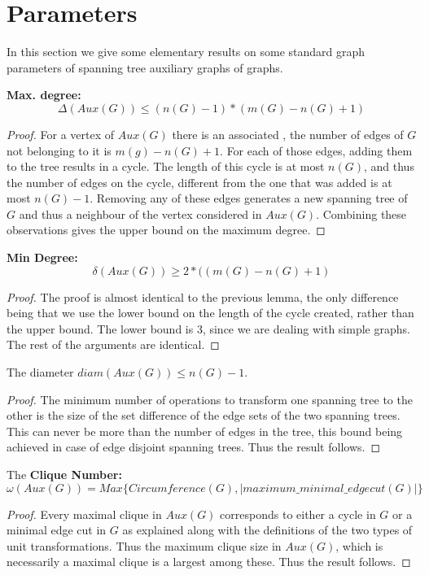 \documentclass{llncs}
\begin{document}
\section{Parameters}\label{secpar}
In this section we give some elementary results on some standard graph parameters of spanning tree auxiliary graphs of graphs.
\begin{lemma}
	{\bf Max. degree:}\[\Delta(Aux(G))\le (n(G)-1)*(m(G)-n(G)+1)\]
\end{lemma}
\begin{proof}
	For a vertex of $Aux(G)$ there is an associated , the number of edges of $G$ not belonging to it is $m(g)-n(G)+1$. For each of those edges, adding them to the tree results in a cycle. The length of this cycle is at most $n(G)$, and thus the number of edges on the cycle, different from the one that was added is at most $n(G)-1$. Removing any of these edges generates a new spanning tree of $G$ and thus a neighbour of the vertex considered in $Aux(G)$. Combining these observations gives the upper bound on the maximum degree. 
\end{proof}
\begin{lemma}
	{\bf Min Degree:}
	\[\delta(Aux(G))\ge2*((m(G)-n(G)+1)\]
\end{lemma}
\begin{proof}
	The proof is almost identical to the previous lemma, the only difference being that we use the lower bound on the length of the cycle created, rather than the upper bound. The lower bound is 3, since we are dealing with simple graphs. The rest of the arguments are identical.
\end{proof}
\begin{lemma}
	The diameter $diam(Aux(G))\le n(G)-1$.
\end{lemma}
\begin{proof}
	The minimum number of operations to transform one spanning tree to the other is the size of the set difference of the edge sets of the two spanning trees. This can never be more than the number of edges in the tree, this bound being achieved in case of edge disjoint spanning trees. Thus the result follows.
\end{proof}

\begin{lemma}
	The {\bf Clique Number:}
	\[\omega(Aux(G))=Max\{{Circumference(G)},|{maximum\_ minimal \_ edge cut(G)}|\}\]
\end{lemma}
\begin{proof}
	Every maximal clique in $Aux(G)$ corresponds to either a cycle in $G$ or a minimal edge cut in $G$ as explained along with the definitions of the two types of unit transformations. Thus the maximum clique size in $Aux(G)$, which is necessarily a maximal clique is a largest among these. Thus the result follows.
\end{proof}
\end{document}
